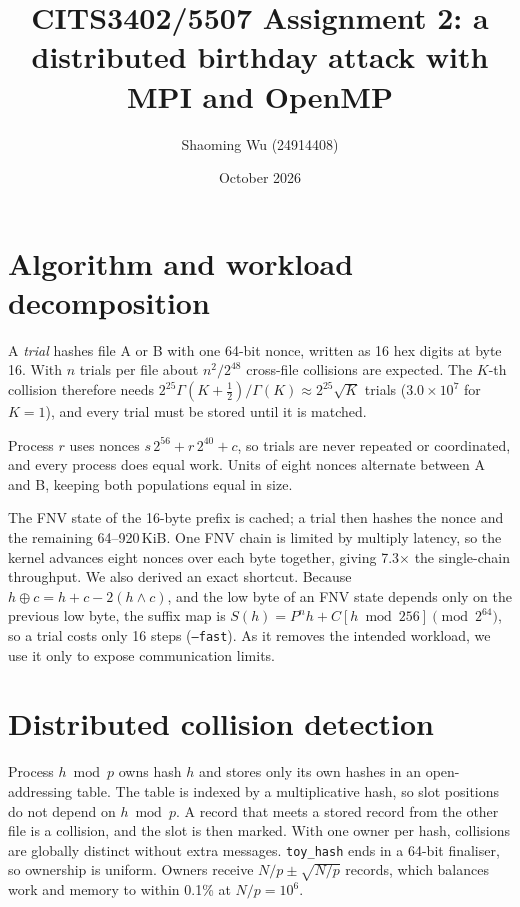 \documentclass[10pt,a4paper]{article}
\title{\vspace{-1.4cm}CITS3402/5507 Assignment 2: a distributed birthday attack with MPI and OpenMP}
\author{Shaoming Wu (24914408)}
\date{October 2026}
\newcommand{\code}[1]{\texttt{#1}}
\begin{document}
\maketitle

\section{Algorithm and workload decomposition}
A \emph{trial} hashes file A or B with one 64-bit nonce, written as 16 hex digits at byte 16. With
$n$ trials per file about $n^2/2^{48}$ cross-file collisions are expected. The $K$-th collision
therefore needs $2^{25}\Gamma(K{+}\tfrac12)/\Gamma(K)\approx2^{25}\sqrt K$ trials ($3.0\times10^7$
for $K{=}1$), and every trial must be stored until it is matched.

Process $r$ uses nonces $s\,2^{56}+r\,2^{40}+c$, so trials are never repeated or coordinated, and
every process does equal work. Units of eight nonces alternate between A and B, keeping both
populations equal in size.

The FNV state of the 16-byte prefix is cached; a trial then hashes the nonce and the remaining
64--920\,KiB. One FNV chain is limited by multiply latency, so the kernel advances eight nonces over
each byte together, giving 7.3$\times$ the single-chain throughput. We also derived an exact shortcut. Because $h\oplus c=h+c-2(h\wedge c)$, and
the low byte of an FNV state depends only on the previous low byte, the suffix map is
$S(h)=P^{n}h+C[h \bmod 256] \pmod{2^{64}}$, so a trial costs only 16 steps (\code{--fast}). As it
removes the intended workload, we use it only to expose communication limits.

\section{Distributed collision detection}
Process $h \bmod p$ owns hash $h$ and stores only its own hashes in an open-addressing table. The
table is indexed by a multiplicative hash, so slot positions do not depend on $h \bmod p$. A record
that meets a stored record from the other file is a collision, and the slot is then marked. With one
owner per hash, collisions are globally distinct without extra messages. \code{toy\_hash} ends in a 64-bit finaliser, so ownership is uniform. Owners receive
$N/p\pm\sqrt{N/p}$ records, which balances work and memory to within 0.1\% at $N/p{=}10^6$.
\end{document}
